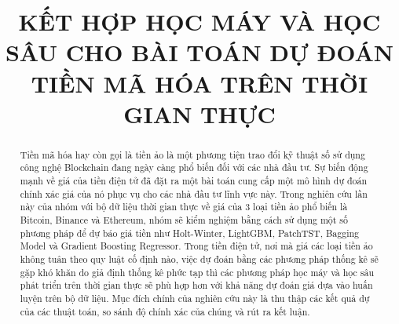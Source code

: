 \documentclass[conference]{IEEEtran}
\begin{document}
\title{KẾT HỢP HỌC MÁY VÀ HỌC SÂU CHO BÀI TOÁN DỰ ĐOÁN TIỀN MÃ HÓA TRÊN THỜI GIAN THỰC\\
}

\author{
\and
{}
\and
{}
\and
\and



}

\maketitle

\begin{abstract}
Tiền mã hóa hay còn gọi là tiền ảo là một phương tiện trao đổi kỹ thuật số sử dụng công nghệ Blockchain đang ngày càng phổ biến đối với các nhà đầu tư. Sự biến động mạnh về giá của tiền điện tử đã đặt ra một bài toán cung cấp một mô hình dự đoán chính xác giá của nó phục vụ cho các nhà đầu tư lĩnh vực này. Trong nghiên cứu lần này của nhóm với bộ dữ liệu thời gian thực về giá của 3 loại tiền ảo phổ biến là Bitcoin, Binance và Ethereum, nhóm sẽ kiểm nghiệm bằng cách sử dụng một số phương pháp để dự báo giá tiền như Holt-Winter, LightGBM, PatchTST, Bagging Model và Gradient Boosting Regressor. Trong tiền điện tử, nơi mà giá các loại tiền ảo không tuân theo quy luật cố định nào, việc dự đoán bằng các phương pháp thống kê sẽ gặp khó khăn do giả định thống kê phức tạp thì các phương pháp học máy và học sâu phát triển trên thời gian thực sẽ phù hợp hơn với khả năng dự đoán giá dựa vào huấn luyện trên bộ dữ liệu. Mục đích chính của nghiên cứu này là thu thập các kết quả dự của các thuật toán, so sánh độ chính xác của chúng và rút ra kết luận.
\end{abstract}
\end{document}
